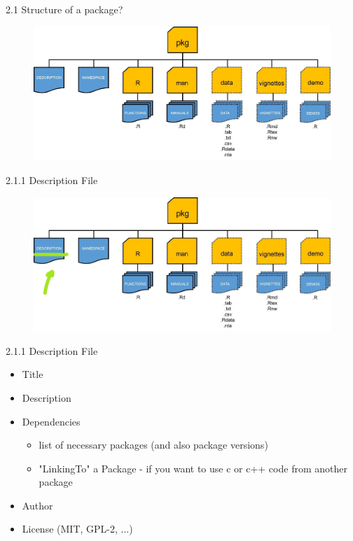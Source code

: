 \documentclass[11pt,a4paper]{beamer}
\begin{document}
\begin{frame}[t]{2.1 Structure of a package?}
	
	
	\begin{figure}
		\centering
		\includegraphics[width=0.9\linewidth]{stott}
		\label{fig:packages}
	\end{figure}
	
	
\end{frame}

\begin{frame}[t]{2.1.1 Description File}
	
	
	\begin{figure}
		\centering
		\includegraphics[width=0.9\linewidth]{Desc}
		\label{fig:packages}
	\end{figure}
	
	
\end{frame}

\begin{frame}[t]{2.1.1 Description File}
	
	\begin{itemize}
		\item Title	
		\item Description
		\item Dependencies
		\begin{itemize}
			\item  list of necessary packages (and also package versions)
			\item "LinkingTo" a Package - if you want to use c or c++ code from another package
		\end{itemize}
		\item Author	
		\item License (MIT, GPL-2, ...)
		
	\end{itemize}
	
\end{frame}
\end{document}

